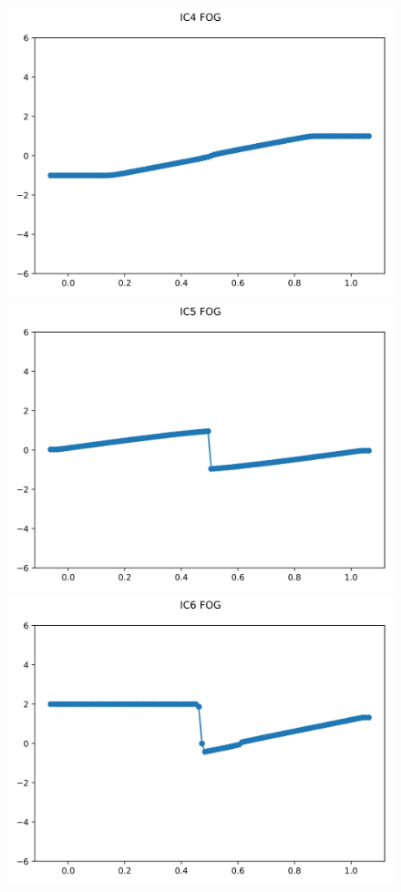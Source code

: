 \documentclass{article}
\begin{document}
\begin{figure}[t]
        \includegraphics[width=.95\textwidth]{../../code/hires_IC4Methodfu_plot.png}
        \includegraphics[width=.95\textwidth]{../../code/hires_IC5Methodfu_plot.png}
        \includegraphics[width=.95\textwidth]{../../code/hires_IC6Methodfu_plot.png}

\end{figure}
\end{document}
